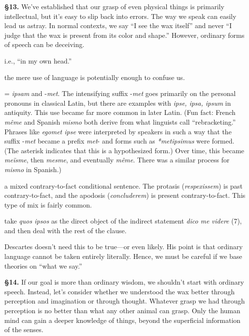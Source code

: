 \prenotes

\textbf{§13.} We've established that our grasp of even physical things is primarily intellectual, but it's easy to slip back into errors. The way we speak can easily lead us astray. In normal contexts, we say ``I see the wax itself'' and never ``I judge that the wax is present from its color and shape.'' However, ordinary forms of speech can be deceiving.

 i.e., ``in my own head.''

 the mere use of language is potentially enough to confuse us.

 = \textit{ipsam} and -\textit{met}. The intensifying suffix -\textit{met} goes primarily on the personal pronouns in classical Latin, but there are examples with \textit{ipse, ipsa, ipsum} in antiquity. This use became far more common in later Latin. (Fun fact: French \textit{même} and Spanish \textit{mismo} both derive from what linguists call ``rebracketing.'' Phrases like \textit{egomet ipse} were interpreted by speakers in such a way that the suffix -\textit{met} became a prefix \textit{met}- and forms such as \textit{*metipsimus} were formed. (The asterisk indicates that this is a hypothesized form.) Over time, this became \textit{meïsme}, then \textit{mesme}, and eventually \textit{même}. There was a similar process for \textit{mismo} in Spanish.)

 a mixed contrary-to-fact conditional sentence. The protasis (\textit{respexissem}) is past contrary-to-fact, and the apodosis (\textit{concluderem}) is present contrary-to-fact. This type of mix is fairly common.

 take \textit{quos ipsos} as the direct object of the indirect statement \textit{dico me videre} (7), and then deal with the rest of the clause.

 Descartes doesn't need this to be true---or even likely. His point is that ordinary language cannot be taken entirely literally. Hence, we must be careful if we base theories on ``what we say.''

\textbf{§14.} If our goal is more than ordinary wisdom, we shouldn't start with ordinary speech. Instead, let's consider whether we understood the wax better through perception and imagination or through thought. Whatever grasp we had through perception is no better than what any other animal can grasp. Only the human mind can gain a deeper knowledge of things, beyond the superficial information of the senses.

